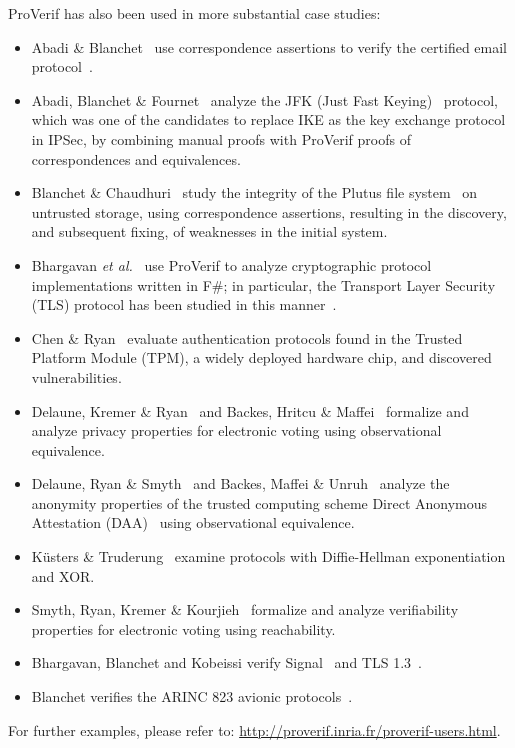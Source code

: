 \documentclass{book}
\begin{document}
ProVerif has also been used in more substantial case studies:
%
\begin{itemize}
	\item{Abadi \& Blanchet~\cite{Abadi04f}} use correspondence assertions to verify the certified email protocol~\cite{Abadi02b}.

	\item{Abadi, Blanchet \& Fournet~\cite{Abadi07}} analyze the JFK (Just Fast Keying)~\cite{Aiello:2004:JFK} protocol, which was one of the candidates to replace IKE as the key exchange protocol in IPSec, by combining manual proofs with ProVerif proofs of correspondences and equivalences.

	\item{Blanchet \& Chaudhuri~\cite{Blanchet08b}} study the integrity of the Plutus file system~\cite{Kallahalla03} on untrusted storage, using correspondence assertions, resulting in the discovery, and subsequent fixing, of weaknesses in the initial system.

	\item{Bhargavan \emph{et al.}~\cite{Bhargavan06,Bhargavan06b,Bhargavan08}} use ProVerif to analyze cryptographic protocol implementations written in F\#; in particular, the Transport Layer Security (TLS) protocol has been studied in this manner~\cite{Bhargavan08b}.

	\item{Chen \& Ryan~\cite{ChenRyan:FAST09}} evaluate authentication protocols found in the Trusted Platform Module (TPM), a widely deployed hardware chip, and discovered vulnerabilities.

	\item{Delaune, Kremer \& Ryan~\cite{DKR09,Kremer05} and Backes, Hritcu \& Maffei~\cite{Backes08a}} formalize and analyze privacy properties for electronic voting using observational equivalence.

	\item{Delaune, Ryan \& Smyth~\cite{DRS08} and Backes, Maffei \& Unruh~\cite{Backes07c}} analyze the anonymity properties of the trusted computing scheme Direct Anonymous Attestation (DAA)~\cite{BCC04,SRC07} using observational equivalence.

	\item{K\"{u}sters \& Truderung~\cite{Kuesters09,Kuesters08b}} examine protocols with Diffie-Hellman exponentiation and XOR.

	\item{Smyth, Ryan, Kremer \& Kourjieh~\cite{SRKK10,SRK10}} formalize and analyze verifiability properties for electronic voting using reachability.
        \item Bhargavan, Blanchet and Kobeissi verify Signal~\cite{KobeissiEuroSP17} and TLS 1.3~\cite{BhargavanSP17}.

\item Blanchet verifies the ARINC 823 avionic protocols~\cite{Blanchet17}.
\end{itemize}
%
For further examples, please refer to: \url{http://proverif.inria.fr/proverif-users.html}.
\end{document}
